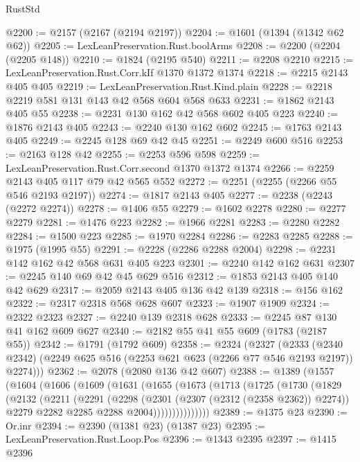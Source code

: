\begin{lexlean}{RustStd}
\begin{coremodule}
@2200 := @2157 (@2167 (@2194 @2197))
@2204 := @1601 (@1394 (@1342 @62 @62))
@2205 := LexLeanPreservation.Rust.boolArms
@2208 := @2200 (@2204 (@2205 @148))
@2210 := @1824 (@2195 @540)
@2211 := @2208 @2210
@2215 := LexLeanPreservation.Rust.Corr.kIf @1370 @1372 @1374
@2218 := @2215 @2143 @405 @405
@2219 := LexLeanPreservation.Rust.Kind.plain
@2228 := @2218 @2219 @581 @131 @143 @42 @568 @604 @568 @633
@2231 := @1862 @2143 @405 @55
@2238 := @2231 @130 @162 @42 @568 @602 @405 @223
@2240 := @1876 @2143 @405
@2243 := @2240 @130 @162 @602
@2245 := @1763 @2143 @405
@2249 := @2245 @128 @69 @42 @45
@2251 := @2249 @600 @516
@2253 := @2163 @128 @42
@2255 := @2253 @596 @598
@2259 := LexLeanPreservation.Rust.Corr.second @1370 @1372 @1374
@2266 := @2259 @2143 @405 @117 @79 @42 @565 @552
@2272 := @2251 (@2255 (@2266 @55 @546 @2193 @2197))
@2274 := @1817 @2143 @405
@2277 := @2238 (@2243 (@2272 @2274))
@2278 := @1406 @55
@2279 := @1602 @2278
@2280 := @2277 @2279
@2281 := @1476 @223
@2282 := @1966 @2281
@2283 := @2280 @2282
@2284 := @1500 @223
@2285 := @1970 @2284
@2286 := @2283 @2285
@2288 := @1975 (@1995 @55)
@2291 := @2228 (@2286 @2288 @2004)
@2298 := @2231 @142 @162 @42 @568 @631 @405 @223
@2301 := @2240 @142 @162 @631
@2307 := @2245 @140 @69 @42 @45 @629 @516
@2312 := @1853 @2143 @405 @140 @42 @629
@2317 := @2059 @2143 @405 @136 @42 @139
@2318 := @156 @162
@2322 := @2317 @2318 @568 @628 @607
@2323 := @1907 @1909
@2324 := @2322 @2323
@2327 := @2240 @139 @2318 @628
@2333 := @2245 @87 @130 @41 @162 @609 @627
@2340 := @2182 @55 @41 @55 @609 (@1783 (@2187 @55))
@2342 := @1791 (@1792 @609)
@2358 := @2324
    (@2327
      (@2333 (@2340 @2342) (@2249 @625 @516 (@2253 @621 @623 (@2266 @77 @546 @2193 @2197)) @2274)))
@2362 := @2078 (@2080 @136 @42 @607)
@2388 := @1389
    (@1557
      (@1604
        (@1606
          (@1609
            (@1631
              (@1655
                (@1673
                  (@1713
                    (@1725
                      (@1730
                        (@1829
                          (@2132
                            (@2211
                              (@2291
                                (@2298
                                  (@2301 (@2307 (@2312 (@2358 @2362)) @2274))
                                  @2279
                                  @2282
                                  @2285
                                  @2288
                                  @2004)))))))))))))))
@2389 := @1375 @23
@2390 := Or.inr
@2394 := @2390 (@1381 @23) (@1387 @23)
@2395 := LexLeanPreservation.Rust.Loop.Pos
@2396 := @1343 @2395
@2397 := @1415 @2396

\end{coremodule}
\end{lexlean}
